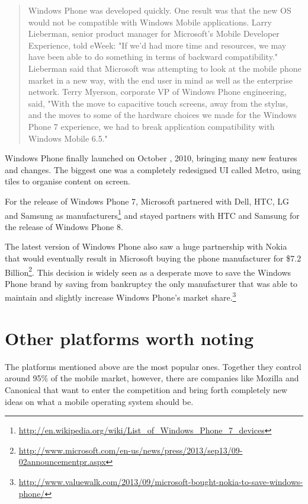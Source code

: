 \begin{quotation}
Windows Phone was developed quickly. One result was that the new \ac{OS} would not be compatible with Windows Mobile applications. Larry Lieberman, senior product manager for Microsoft's Mobile Developer Experience, told eWeek: "If we'd had more time and resources, we may have been able to do something in terms of backward compatibility." Lieberman said that Microsoft was attempting to look at the mobile phone market in a new way, with the end user in mind as well as the enterprise network. Terry Myerson, corporate VP of Windows Phone engineering, said, "With the move to capacitive touch screens, away from the stylus, and the moves to some of the hardware choices we made for the Windows Phone 7 experience, we had to break application compatibility with Windows Mobile 6.5."
\cite{wikipedia:windows_phone}
\end{quotation}

Windows Phone finally launched on October , 2010, bringing many new features and changes. The biggest one was a completely redesigned UI called Metro, using tiles to organise content on screen.  

For the release of Windows Phone 7, Microsoft partnered with Dell, HTC, LG and Samsung as manufacturers\footnote{\url{http://en.wikipedia.org/wiki/List_of_Windows_Phone_7_devices}} and stayed partners with HTC and Samsung for the release of Windows Phone 8.


The latest version of Windows Phone also saw a huge partnership with Nokia that would eventually result in Microsoft buying the phone manufacturer for \$7.2 Billion\footnote{\url{http://www.microsoft.com/en-us/news/press/2013/sep13/09-02announcementpr.aspx}}. This decision is widely seen as a desperate move to save the Windows Phone brand by saving from bankruptcy the only manufacturer that was able to maintain and slightly increase Windows Phone's market share.\footnote{\url{http://www.valuewalk.com/2013/09/microsoft-bought-nokia-to-save-windows-phone/}}  
 






\section{Other platforms worth noting}
The platforms mentioned above are the most popular ones. Together they control around 95\% of the mobile market, however, there are companies like Mozilla and Canonical that want to enter the competition and bring forth completely new ideas on what a mobile operating system should be.

